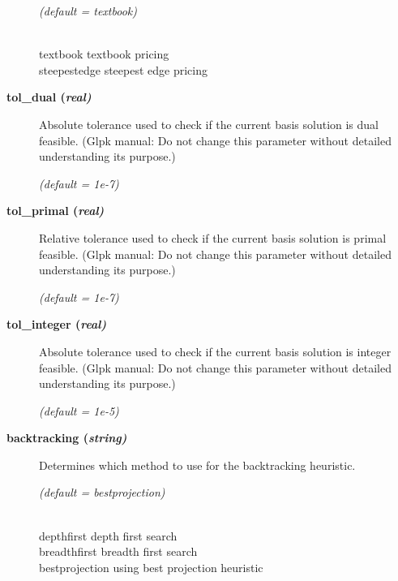 \begin{description}
\textsl{(default = textbook)}
\begin{tabbing}
\hspace{1in} \= \\
textbook \> textbook pricing \\
steepestedge \> steepest edge pricing
\end{tabbing}

\item[\label{tol_dual}\hypertarget{tol_dual}
{\textbf{tol\_dual (\slshape{real})}}]\hspace{1.0in}

Absolute tolerance used to check if the current basis solution is dual feasible.
(Glpk manual: Do not change this parameter without detailed understanding its purpose.)

\textsl{(default = 1e-7)}

\item[\label{tol_primal}\hypertarget{tol_primal}
{\textbf{tol\_primal (\slshape{real})}}]\hspace{1.0in}

Relative tolerance used to check if the current basis solution is primal feasible.
(Glpk manual: Do not change this parameter without detailed understanding its purpose.)

\textsl{(default = 1e-7)}

\item[\label{tol_integer}\hypertarget{tol_integer}
{\textbf{tol\_integer (\slshape{real})}}]\hspace{1.0in}

Absolute tolerance used to check if the current basis solution is integer feasible.
(Glpk manual: Do not change this parameter without detailed understanding its purpose.)

\textsl{(default = 1e-5)}

\item[\label{backtracking}\hypertarget{backtracking}
{\textbf{backtracking (\slshape{string})}}]\hspace{1.0in}

Determines which method to use for the backtracking heuristic.

\textsl{(default = bestprojection)}
\begin{tabbing}
\hspace{1in} \= \\
depthfirst \> depth first search \\
breadthfirst \> breadth first search \\
bestprojection \> using best projection heuristic
\end{tabbing}


\end{description}
